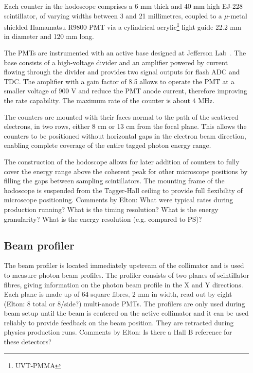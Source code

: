 Each counter in the hodoscope comprises a 6 mm thick and 40 mm high EJ-228 scintillator, of varying widths between 3 and 21 millimetres, coupled to a $\mu$-metal shielded Hamamatsu R9800 PMT via a cylindrical acrylic\footnote{UVT-PMMA} light guide 22.2 mm in diameter and 120 mm long.

The PMTs are instrumented with an active base designed at Jefferson Lab~\cite{tagh:base}. The base consists of a high-voltage divider and an amplifier powered by current flowing through the divider and provides two signal outputs for flash ADC and TDC.
The amplifier with a gain factor of 8.5 allows to operate the PMT at  a smaller voltage of 900 V and reduce the PMT anode current, therefore improving the rate capability. The maximum rate of the counter is about 4 MHz.

The counters are mounted with their faces normal to the path of the scattered electrons, in two rows, either 8 cm or 13 cm from the focal plane.
This allows the counters to be positioned without horizontal gaps in the electron beam direction, enabling complete coverage of the entire tagged photon energy range.

The construction of the hodoscope allows for later addition of counters to fully cover the energy range above the coherent peak for other microscope positions by filling the gaps between sampling scintillators. The mounting frame of the hodoscope is suspended from the Tagger-Hall ceiling to provide full flexibility of microscope positioning.
{\color{red} Comments by Elton: What were typical rates during production running? What is the timing resolution? What is the energy granularity? What is the energy resolution (e.g. compared to PS)?}

\subsection{Beam profiler}
The beam profiler is located immediately upstream of the collimator and is used to measure photon beam profiles.
The profiler consists of two planes of scintillator fibres, giving information on the photon beam profile in the X and Y directions.
Each plane is made up of 64 square fibres, 2 mm in width, read out by eight {\color{red} (Elton: 8 total or 8/side?)} multi-anode PMTs. The profilers are only used during beam setup until
the beam is centered on the active collimator and it can be used reliably to provide feedback on the beam position. They are retracted during physics production runs.
{\color{red} Comments by Elton: Is there a Hall B reference for these detectors?}

